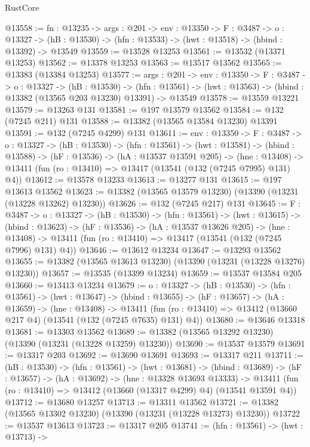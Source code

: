 \begin{lexlean}{RustCore}
\begin{coremodule}
@13558 := {fn : @13235} ->
  {args : @201} ->
  {env : @13350} ->
  {F : @3487} ->
  {o : @13327} -> (hB : @13530) -> (hfn : @13533) -> (hwt : @13518) -> (hbind : @13392) -> @13549
@13559 := @13528 @13253
@13561 := @13532 (@13371 @13253)
@13562 := @13378 @13253
@13563 := @13517 @13562
@13565 := @13383 (@13384 @13253)
@13577 := {args : @201} ->
  {env : @13350} ->
  {F : @3487} ->
  {o : @13327} ->
  (hB : @13530) ->
  (hfn : @13561) -> (hwt : @13563) -> (hbind : @13382 (@13565 @203 @13230) @13391) -> @13549
@13578 := @13559 @13221
@13579 := @13263 @131
@13581 := @197 @13579 @13562
@13584 := @132 (@7245 @211) @131
@13588 := @13382 (@13565 @13584 @13230) @13391
@13591 := @132 (@7245 @4299) @131
@13611 := {env : @13350} ->
  {F : @3487} ->
  {o : @13327} ->
  (hB : @13530) ->
  (hfn : @13561) ->
  (hwt : @13581) ->
  (hbind : @13588) ->
  (hF : @13536) ->
  (hA : @13537 @13591 @205) ->
  (hne : @13408) -> @13411 (fun (ro : @13410) => @13417 (@13541 (@132 (@7245 @7995) @131) @4))
@13612 := @13578 @13233
@13613 := @13277 @131
@13615 := @197 @13613 @13562
@13623 := @13382 (@13565 @13579 @13230) (@13390 (@13231 (@13228 @13262) @13230))
@13626 := @132 (@7245 @217) @131
@13645 := {F : @3487} ->
  {o : @13327} ->
  (hB : @13530) ->
  (hfn : @13561) ->
  (hwt : @13615) ->
  (hbind : @13623) ->
  (hF : @13536) ->
  (hA : @13537 @13626 @205) ->
  (hne : @13408) -> @13411 (fun (ro : @13410) => @13417 (@13541 (@132 (@7245 @7996) @131) @4))
@13646 := @13612 @13234
@13647 := @13293 @13562
@13655 := @13382 (@13565 @13613 @13230) (@13390 (@13231 (@13228 @13276) @13230))
@13657 := @13535 (@13399 @13234)
@13659 := @13537 @13584 @205
@13660 := @13413 @13234
@13679 := {o : @13327} ->
  (hB : @13530) ->
  (hfn : @13561) ->
  (hwt : @13647) ->
  (hbind : @13655) ->
  (hF : @13657) ->
  (hA : @13659) ->
  (hne : @13408) ->
  @13411 (fun (ro : @13410) => @13412 (@13660 @217 @4) (@13541 (@132 (@7245 @7635) @131) @4))
@13680 := @13646 @13318
@13681 := @13303 @13562
@13689 := @13382 (@13565 @13292 @13230) (@13390 (@13231 (@13228 @13259) @13230))
@13690 := @13537 @13579
@13691 := @13317 @203
@13692 := @13690 @13691
@13693 := @13317 @211
@13711 := (hB : @13530) ->
  (hfn : @13561) ->
  (hwt : @13681) ->
  (hbind : @13689) ->
  (hF : @13657) ->
  (hA : @13692) ->
  (hne : @13328 @13693 @13333) ->
  @13411 (fun (ro : @13410) => @13412 (@13660 (@13317 @4299) @4) (@13541 @13591 @4))
@13712 := @13680 @13257
@13713 := @13311 @13562
@13721 := @13382 (@13565 @13302 @13230) (@13390 (@13231 (@13228 @13273) @13230))
@13722 := @13537 @13613
@13723 := @13317 @205
@13741 := (hfn : @13561) ->
  (hwt : @13713) ->

\end{coremodule}
\end{lexlean}
